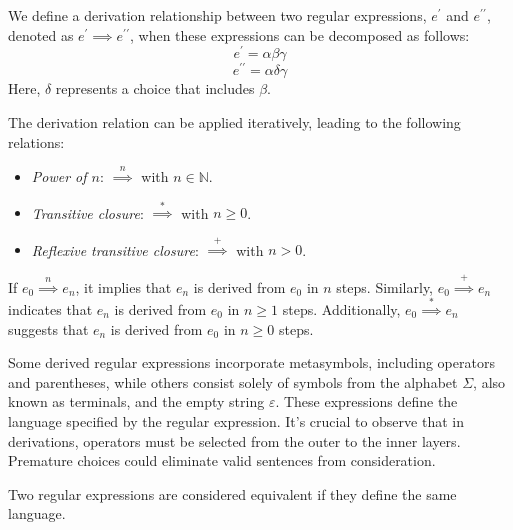 \begin{definition}
    We define a derivation relationship between two regular expressions, $e^{\prime}$ and $e^{\prime\prime}$, denoted as $e^{\prime} \implies e^{\prime\prime}$,  when these expressions can be decomposed as follows:
    \[e^{\prime}=\alpha \beta \gamma\]
    \[e^{\prime\prime}=\alpha \delta \gamma\]
    Here, $\delta$ represents a choice that includes $\beta$.
\end{definition}
The derivation relation can be applied iteratively, leading to the following relations:
\begin{itemize}
    \item \textit{Power of $n$}: $\overset{n}{\implies}$ with $n \in \mathbb{N}$. 
    \item \textit{Transitive closure}: $\overset{\ast}{\implies}$ with $n \geq 0$. 
    \item \textit{Reflexive transitive closure}: $\overset{+}{\implies}$ with $n > 0$.
\end{itemize}
\begin{example}
    If $e_0 \overset{n}{\implies} e_n$, it implies that $e_n$ is derived from $e_0$ in $n$ steps.
    Similarly, $e_0 \overset{+}{\implies} e_n$ indicates that $e_n$ is derived from $e_0$ in $n \geq 1$ steps.
    Additionally, $e_0 \overset{\ast}{\implies} e_n$ suggests that $e_n$ is derived from $e_0$ in $n \geq 0$ steps.
\end{example}
Some derived regular expressions incorporate metasymbols, including operators and parentheses, while others consist solely of symbols from the alphabet $\Sigma$, also known as terminals, and the empty string $\varepsilon$. 
These expressions define the language specified by the regular expression.
It's crucial to observe that in derivations, operators must be selected from the outer to the inner layers. 
Premature choices could eliminate valid sentences from consideration.
\begin{definition}
    Two regular expressions are considered equivalent if they define the same language. 
\end{definition}

